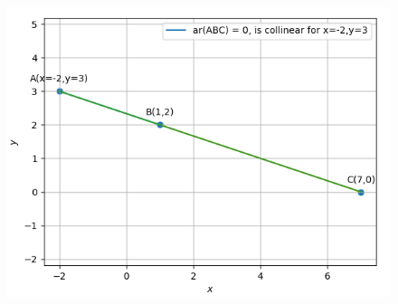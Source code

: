 \documentclass[12pt]{article}
\begin{document}
\begin{figure}[!h]
	\begin{center} 
	    \includegraphics[width=\columnwidth]{./figs/sc.png}
	\end{center}
\caption{}
\label{fig:Fig}
\end{figure}
\end{document}
